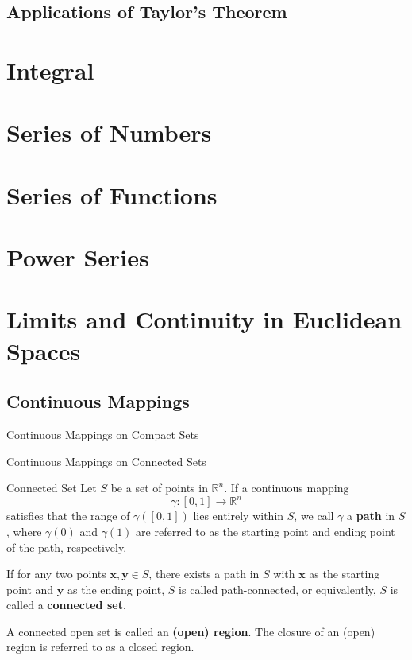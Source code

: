 \documentclass[11pt]{elegantbook}
\begin{document}
\section{Applications of Taylor's Theorem}

\chapter{Integral}

\chapter{Series of Numbers}

\chapter{Series of Functions}

\chapter{Power Series}

\chapter{Limits and Continuity in Euclidean Spaces}

\section{Continuous Mappings}
\begin{leftbarTitle}{Continuous Mappings on Compact Sets}\end{leftbarTitle}

\begin{leftbarTitle}{Continuous Mappings on Connected Sets}\end{leftbarTitle}
\begin{definition}{Connected Set}
    Let \(S\) be a set of points in \(\mathbb{R}^n\). 
    If a continuous mapping 
    \[
        \gamma: [0, 1] \to \mathbb{R}^n
    \]
    satisfies that the range of \(\gamma([0, 1])\) lies entirely within \(S\), 
    we call \(\gamma\) a \textbf{path} in \(S\), 
    where \(\gamma(0)\) and \(\gamma(1)\) are referred to as the starting point and ending point of the path, respectively.  
    
    If for any two points \(\mathbf{x}, \mathbf{y} \in S\), 
    there exists a path in \(S\) with \(\mathbf{x}\) as the starting point and \(\mathbf{y}\) as the ending point, 
    \(S\) is called path-connected, or equivalently, \(S\) is called a \textbf{connected set}.  
    
    A connected open set is called an \textbf{(open) region}. The closure of an (open) region is referred to as a closed region.
\end{definition}
\end{document}
